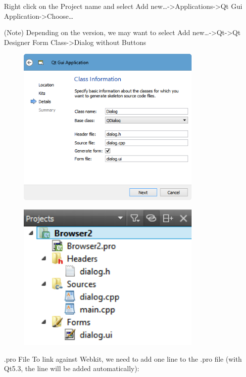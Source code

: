 Right click on the Project name and select Add
new\ldots{}-\textgreater{}Applications-\textgreater{}Qt Gui
Application-\textgreater{}Choose\ldots{}

(Note) Depending on the version, we may want to select Add
new\ldots{}-\textgreater{}Qt-\textgreater{}Qt Designer Form
Class-\textgreater{}Dialog without Buttons

\begin{figure}[htbp]
\centering
\includegraphics[width=0.8\textwidth]{../manuscript/images/QDialog}
\caption{}
\end{figure}

\begin{figure}[htbp]
\centering
\includegraphics[width=0.8\textwidth]{../manuscript/images/Browser2_Files}
\caption{}
\end{figure}

.pro File To link against Webkit, we need to add one line to the .pro
file (with Qt5.3, the line will be added automatically):

